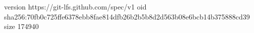 version https://git-lfs.github.com/spec/v1
oid sha256:70fb0c725ffe6378ebb8fae814dfb26b2b5b8d2d563b08e6bcb14b375888cd39
size 174940
